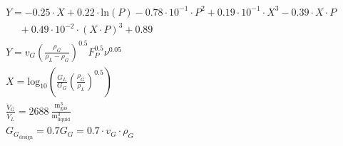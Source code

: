 \begin{refsection}[referencesCh6]

\begin{align}
	&Y =  - 0.25 \cdot X + 0.22 \cdot \text{ln}(P) - 0.78\cdot10^{-1} \cdot P^2 + 0.19\cdot10^{-1} \cdot X^3 - 0.39 \cdot X \cdot P \label{eq:FloodingALAMO} \\
	& \ \ \ \ \ \ + 0.49\cdot10^{-2} \cdot (X\cdot P)^3 + 0.89  \nonumber \\
	&Y = v_G \left(\frac{\rho_G}{\rho_L-\rho_G}\right)^{0.5} F_{P}^{0.5} \nu^{0.05} \\
	&X = \text{log}_{10} \left(\frac{G_L}{G_G} \left(\frac{\rho_G}{\rho_L}\right)^{0.5}\right) \\
	&\frac{\dot{V}_G}{\dot{V}_L} = 2688 \ \frac{\text{m}^3_{\text{gas}}}{\text{m}^3_{\text{liquid}}} \label{eq:OpLine}
	\\
	& G_{G_{\text{design}}} = 0.7 G_G = 0.7 \cdot v_G \cdot \rho_G\label{eq:G_Design}
\end{align}


\end{refsection}
